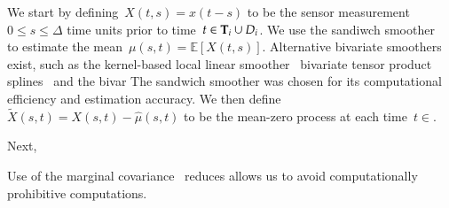\documentclass[11pt]{amsart}
\def\E{\mathcal{E}}
\def\E{\mathbb{E}}
\def\bfT{{\bf T}}
\begin{document}
We start by defining~$X(t,s) = x(t-s)$ to be the sensor measurement~$0
\leq s \leq \Delta$ time units prior to time~$t \in \bfT_i \cup D_i$.
We use the sandiwch smoother~\citep{Xiao2013} to estimate the
mean~$\mu(s,t) = \E [ X(t,s)]$.
Alternative bivariate smoothers exist, such as the kernel-based local
linear smoother~\citep{Hastie2009} bivariate tensor product
splines~\cite{Wood2006} and the bivar
The sandwich smoother was chosen for its computational efficiency and
estimation accuracy.
We then define~$\tilde X(s,t) = X(s,t) - \hat \mu(s,t)$ to be the
mean-zero process at each time~$t \in $.


Next, 



Use of the marginal covariance~\cite{Park2018} reduces allows us to avoid
computationally prohibitive computations.
\end{document}

